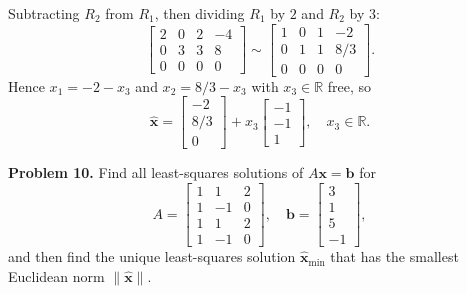\documentclass[11pt, letterpaper]{article}
\theoremstyle{definition}
\theoremstyle{remark}
\begin{document}
Subtracting $R_2$ from $R_1$, then dividing $R_1$ by $2$ and $R_2$ by $3$:
\[
\left[\begin{array}{ccc|c} 2 & 0 & 2 & -4 \\ 0 & 3 & 3 & 8 \\ 0 & 0 & 0 & 0 \end{array}\right] \sim \left[\begin{array}{ccc|c} 1 & 0 & 1 & -2 \\ 0 & 1 & 1 & 8/3 \\ 0 & 0 & 0 & 0 \end{array}\right].
\]
Hence $x_1 = -2 - x_3$ and $x_2 = 8/3 - x_3$ with $x_3 \in \mathbb{R}$ free, so
\[
\hat{\mathbf{x}} = \begin{bmatrix} -2 \\ 8/3 \\ 0 \end{bmatrix} + x_3 \begin{bmatrix} -1 \\ -1 \\ 1 \end{bmatrix}, \quad x_3 \in \mathbb{R}.
\]

\textbf{Problem 10.} Find all least-squares solutions of $A\mathbf{x} = \mathbf{b}$ for
\[
A = \begin{bmatrix} 1 & 1 & 2 \\ 1 & -1 & 0 \\ 1 & 1 & 2 \\ 1 & -1 & 0 \end{bmatrix}, \quad \mathbf{b} = \begin{bmatrix} 3 \\ 1 \\ 5 \\ -1 \end{bmatrix},
\]
and then find the unique least-squares solution $\hat{\mathbf{x}}_{\min}$ that has the smallest Euclidean norm $\|\hat{\mathbf{x}}\|$.
\end{document}
